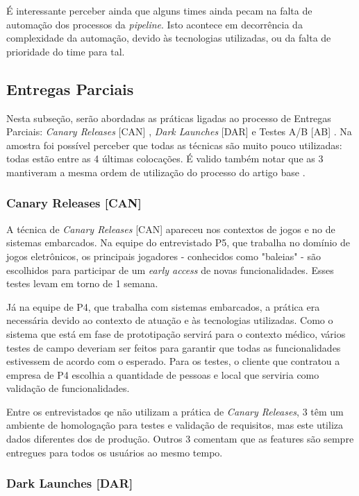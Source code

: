 É interessante perceber ainda que alguns times ainda pecam na falta de automação dos processos da \emph{pipeline}. Isto acontece em decorrência da complexidade da automação, devido às tecnologias utilizadas, ou da falta de prioridade do time para tal.
 
\subsection{Entregas Parciais}

Nesta subseção, serão abordadas as práticas ligadas ao processo de Entregas Parciais: \emph{Canary Releases} [CAN] \cite{continuousDeliveryBook}, \emph{Dark Launches} [DAR] \cite{devAndDeploymentFB} e Testes A/B [AB] \cite{testsAB}. Na amostra foi possível perceber que todas as técnicas são muito pouco utilizadas: todas estão entre as 4 últimas colocações. É valido também notar que as 3 mantiveram a mesma ordem de utilização do processo do artigo base \cite{empiricalStudy2016}.

\subsubsection{Canary Releases [CAN]}

A técnica de \emph{Canary Releases} [CAN] apareceu nos contextos de jogos e no de sistemas embarcados. Na equipe do entrevistado P5, que trabalha no domínio de jogos eletrônicos, os principais jogadores - conhecidos como "baleias" - são escolhidos para participar de um \emph{early access} de novas funcionalidades.  Esses testes levam em torno de 1 semana. 

Já na equipe de P4, que trabalha com sistemas embarcados, a prática era necessária devido ao contexto de atuação e às tecnologias utilizadas. Como o sistema que está em fase de prototipação servirá para o contexto médico, vários testes de campo deveriam ser feitos para garantir que todas as funcionalidades estivessem de acordo com o esperado. Para os testes, o cliente que contratou a empresa de P4 escolhia a quantidade de pessoas e local que serviria como validação de funcionalidades.

Entre os entrevistados qe não utilizam a prática de \emph{Canary Releases}, 3 têm um ambiente de homologação para testes e validação de requisitos, mas este utiliza dados diferentes dos de produção. Outros 3 comentam que as features são sempre entregues para todos os usuários ao mesmo tempo.


\subsubsection{Dark Launches [DAR]}


